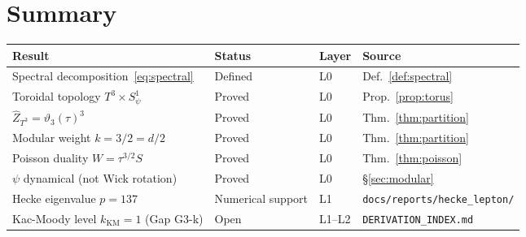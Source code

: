 \documentclass[11pt,a4paper]{article}
\theoremstyle{definition}
\theoremstyle{remark}
\begin{document}
\section{Summary}\label{sec:summary_theta}

\begin{center}
\begin{longtable}{llll}
\toprule
Result & Status & Layer & Source \\
\midrule
Spectral decomposition~\eqref{eq:spectral} & Defined & L0 &
  Def.~\ref{def:spectral} \\
Toroidal topology $T^3\times S^1_\psi$ & Proved & L0 &
  Prop.~\ref{prop:torus} \\
$\hat{Z}_{T^3} = \vartheta_3(\tau)^3$ & Proved & L0 &
  Thm.~\ref{thm:partition} \\
Modular weight $k = 3/2 = d/2$ & Proved & L0 &
  Thm.~\ref{thm:partition} \\
Poisson duality $W = \tau^{3/2}S$ & Proved & L0 &
  Thm.~\ref{thm:poisson} \\
$\psi$ dynamical (not Wick rotation) & Proved & L0 &
  \S\ref{sec:modular} \\
Hecke eigenvalue $p=137$ & Numerical support & L1 &
  \texttt{docs/reports/hecke\_lepton/} \\
Kac-Moody level $k_{\mathrm{KM}}=1$ (Gap G3-k) & Open & L1--L2 &
  \texttt{DERIVATION\_INDEX.md} \\
\bottomrule
\end{longtable}
\end{center}
\end{document}
